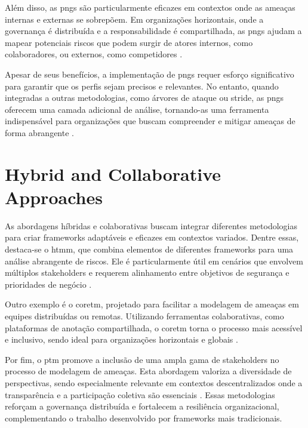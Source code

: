 Além disso, as \gls{pngs} são particularmente eficazes em contextos onde as
ameaças internas e externas se sobrepõem. Em organizações horizontais,
onde a governança é distribuída e a responsabilidade é compartilhada,
as \gls{pngs} ajudam a mapear potenciais riscos que podem surgir de atores
internos, como colaboradores, ou externos, como competidores
\cite{PersonaeNonGratae}.

Apesar de seus benefícios, a implementação de \gls{pngs} requer esforço
significativo para garantir que os perfis sejam precisos e relevantes.
No entanto, quando integradas a outras metodologias, como árvores de
ataque ou \gls{stride}, as \gls{pngs} oferecem uma camada adicional de análise,
tornando-as uma ferramenta indispensável para organizações que buscam
compreender e mitigar ameaças de forma abrangente
\cite{PnGRequirementsPhaseThreatModeling}.

\section{Hybrid and Collaborative Approaches}
\label{sec:hybrid_collaborative_approaches}

As abordagens híbridas e colaborativas buscam integrar diferentes
metodologias para criar frameworks adaptáveis e eficazes em contextos
variados. Dentre essas, destaca-se o \gls{htmm}, que combina elementos
de diferentes frameworks para uma análise abrangente de riscos.
Ele é particularmente útil em cenários que envolvem múltiplos
stakeholders e requerem alinhamento entre objetivos de segurança
e prioridades de negócio \cite{AHybridThreatModelingMethod}.

Outro exemplo é o \gls{coretm},
projetado para facilitar a modelagem de ameaças em equipes
distribuídas ou remotas. Utilizando ferramentas colaborativas, como
plataformas de anotação compartilhada, o \gls{coretm} torna o processo mais
acessível e inclusivo, sendo ideal para organizações horizontais e
globais \cite{CoReTM}.

Por fim, o \gls{ptm} promove a inclusão de
uma ampla gama de stakeholders no processo de modelagem de ameaças.
Esta abordagem valoriza a diversidade de perspectivas, sendo
especialmente relevante em contextos descentralizados onde a
transparência e a participação coletiva são essenciais
\cite{ParticipatoryThreatModelling}. Essas metodologias reforçam a
governança distribuída e fortalecem a resiliência organizacional,
complementando o trabalho desenvolvido por frameworks mais
tradicionais.



